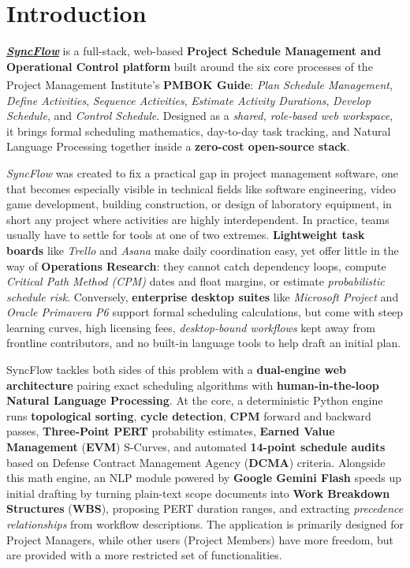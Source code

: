 \chapter{Introduction}
\underline{\textbf{\textit{SyncFlow}}} is a full-stack, web-based \textbf{Project Schedule Management and Operational Control platform} built around the six core processes of the Project Management Institute's \textbf{PMBOK\textsuperscript{\textregistered} Guide}: \textit{Plan Schedule Management}, \textit{Define Activities}, \textit{Sequence Activities}, \textit{Estimate Activity Durations}, \textit{Develop Schedule}, and \textit{Control Schedule}. Designed as a \textit{shared, role-based web workspace}, it brings formal scheduling mathematics, day-to-day task tracking, and Natural Language Processing together inside a \textbf{zero-cost open-source stack}.

\vspace{4mm}

\textit{SyncFlow} was created to fix a practical gap in project management software, one that becomes especially visible in technical fields like software engineering, video game development, building construction, or design of laboratory equipment, in short any project where activities are highly interdependent. In practice, teams usually have to settle for tools at one of two extremes. \textbf{Lightweight task boards} like \textit{Trello} and \textit{Asana} make daily coordination easy, yet offer little in the way of \textbf{Operations Research}: they cannot catch dependency loops, compute \textit{Critical Path Method (CPM)} dates and float margins, or estimate \textit{probabilistic schedule risk}. Conversely, \textbf{enterprise desktop suites} like \textit{Microsoft Project} and \textit{Oracle Primavera P6} support formal scheduling calculations, but come with steep learning curves, high licensing fees, \textit{desktop-bound workflows} kept away from frontline contributors, and no built-in language tools to help draft an initial plan.

\vspace{4mm}

SyncFlow tackles both sides of this problem with a \textbf{dual-engine web architecture} pairing exact scheduling algorithms with \textbf{human-in-the-loop Natural Language Processing}. At the core, a deterministic Python engine runs \textbf{topological sorting}, \textbf{cycle detection}, \textbf{CPM} forward and backward passes, \textbf{Three-Point PERT} probability estimates, \textbf{Earned Value Management} (\textbf{EVM}) S-Curves, and automated \textbf{14-point schedule audits} based on Defense Contract Management Agency (\textbf{DCMA}) criteria. Alongside this math engine, an NLP module powered by \textbf{Google Gemini Flash} speeds up initial drafting by turning plain-text scope documents into \textbf{Work Breakdown Structures} (\textbf{WBS}), proposing PERT duration ranges, and extracting \textit{precedence relationships} from workflow descriptions. The application is primarily designed for Project Managers, while other users (Project Members) have more freedom, but are provided with a more restricted set of functionalities. 

